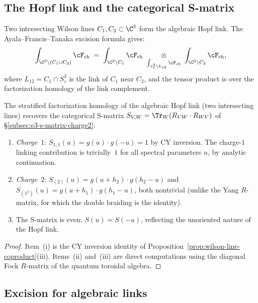 \subsection{The Hopf link and the categorical S-matrix}
\label{subsec:hopf-link-s-matrix}
\label{subsec:e3-s-matrix-charge2}

Two intersecting Wilson lines $C_1, C_2 \subset \C^3$ form the algebraic Hopf link. The Ayala--Francis--Tanaka excision formula gives:
\[
 \int_{\C^3 \setminus (C_1 \cup C_2)} \cF_{\mathrm{ch}} \;=\; \int_{\C^3 \setminus C_1} \cF_{\mathrm{ch}} \;\underset{\int_{S^3_\varepsilon \setminus L_{12}} \cF_{\mathrm{ch}}}{\otimes}\; \int_{\C^3 \setminus C_2} \cF_{\mathrm{ch}},
\]
where $L_{12} = C_1 \cap S^3_\varepsilon$ is the link of $C_1$ near $C_2$, and the tensor product is over the factorization homology of the link complement.

\begin{proposition}[Hopf link = categorical S-matrix]
\label{prop:hopf-link-s-matrix}
\label{prop:s-matrix-charge1-trivial}
The stratified factorization homology of the algebraic Hopf link (two intersecting lines) recovers the categorical S-matrix $S_{V,W} = \Tr_W(R_{VW} \cdot R_{WV})$ of \S\ref{subsec:e3-s-matrix-charge2}:
\begin{enumerate}[label=\textup{(\roman*)}]
 \item \emph{Charge~$1$}: $S_{1,1}(u) = g(u) \cdot g(-u) = 1$ by CY inversion. The charge-$1$ linking contribution is trivially~$1$ for all spectral parameters $u$, by analytic continuation.
 \item \emph{Charge~$2$}: $S_{(2)}(u) = g(u + h_2) \cdot g(h_2 - u)$ and $S_{(1^2)}(u) = g(u + h_1) \cdot g(h_1 - u)$, both nontrivial (unlike the Yang $R$-matrix, for which the double braiding is the identity).
 \item The S-matrix is even: $S(u) = S(-u)$, reflecting the unoriented nature of the Hopf link.
\end{enumerate}
\end{proposition}

\begin{proof}
Item~(i) is the CY inversion identity of Proposition~\ref{prop:wilson-line-coproduct}(iii). Items~(ii) and~(iii) are direct computations using the diagonal Fock $R$-matrix of the quantum toroidal algebra.
\end{proof}


\subsection{Excision for algebraic links}
\label{subsec:excision-alg-links}

